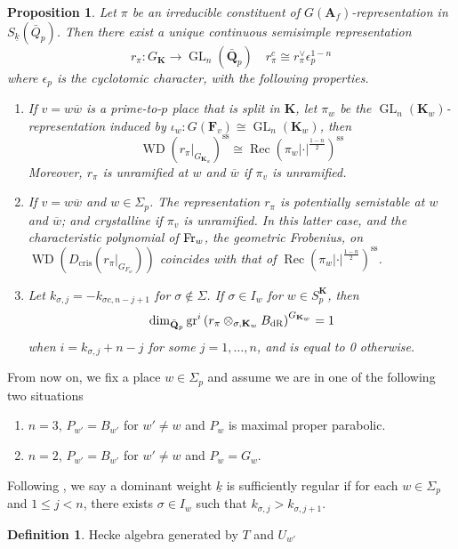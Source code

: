 \documentclass[leqno]{amsart}
\newcommand{\wt}[1]{\underline{ #1 }}
\newcommand{\bw}{\overline{w}}
\newcommand{\Fr}{\textnormal{Fr}} %
\newcommand{\dR}{\textnormal{dR}}
\DeclareMathOperator{\WD}{WD}
\DeclareMathOperator{\Rec}{Rec}
\DeclareMathOperator{\GL}{GL}
\newcommand{\Q}{{\mathbf{Q}}}
\newcommand{\A}{\mathbf A}
\newcommand{\F}{{\mathbf{F}}} %
\newcommand{\K}{{\mathbf{K}}} %
\newtheorem{prop}[thm]{Proposition}
\theoremstyle{definition}
\newtheorem{defn}[thm]{Definition}
\theoremstyle{remark}
\begin{document}
\begin{prop}\cite[Prop.2.27]{ger}
	Let $\pi$ be an irreducible constituent of 
	$G(\A_f)$-representation in $S_{\wt{k}}(\bar{Q}_p)$.
	Then there exist a unique continuous semisimple representation
	\[
	r_\pi: G_\K \rightarrow \GL_n(\bar{\Q}_p)\quad
	r_\pi^c \cong r_\pi^{\vee} \epsilon_p^{1-n}
	\]
	where $\epsilon_p$ is the cyclotomic character,
	with the following properties.
\begin{enumerate}[label=(\alph*)]
\item If $v=w\bw$ is a prime-to-$p$ place that is split in $\K$,
let $\pi_w$ be the $\GL_n(\K_w)$-representation
induced by $\iota_w\colon G(\F_v)\cong \GL_n(\K_w)$, then
\[
\WD\left(\left.r_\pi\right|_{G_{\K_w}}\right)^{\mathrm{ss}} \cong
\Rec(\pi_w|\cdot|^{\frac{1-n}{2}})^{\mathrm{ss}}
\]
Moreover, $r_\pi$ is unramified at $w$ and $\bw$ if $\pi_v$ is unramified.
\item If $v=w\bw$ and  $w\in \Sigma_p$.
The representation $r_\pi$ is potentially semistable at $w$ and  $\bw$;
and crystalline if $\pi_v$ is unramified.
In this latter case, 
and the characteristic polynomial of $\Fr_w$, the geometric Frobenius,
on $\WD\left(D_{\mathrm{cris }}\left(\left.r_\pi\right|_{G_{F_w}}\right)\right)$
coincides with that of $\Rec(\pi_w|\cdot|^{\frac{1-n}{2}})^{\mathrm{ss}}$.
\item 
Let $k_{\sigma,j}=-k_{\sigma c, n-j+1}$
for $\sigma\notin \Sigma$.
If $\sigma\in I_w$ for $w\in S_p^\K$, then
\[
\dim_{\bar{\Q}_p}\operatorname{gr}^i
\left(r_\pi \otimes_{\sigma, \K_w} B_{\dR}\right)^{G_{\K_w}}=1
\]
when $i=k_{\sigma, j}+n-j$ 
for some $j=1, \ldots, n$, and is equal to 0 otherwise.
\end{enumerate}
\end{prop}

From now on,
we fix a place $w\in \Sigma_p$ and
assume we are in one of the following two situations
\begin{enumerate}[label=(\Roman*)]
	\item $n=3$, $P_{w'}=B_{w'}$ for $w'\neq w$ and $P_w$ is
		maximal proper parabolic.
	\item $n=2$, $P_{w'}=B_{w'}$ for $w'\neq w$ and $P_w=G_w$.
\end{enumerate}

Following \cite{ger},
we say a dominant weight $\wt{k}$ is sufficiently regular
if for each $w\in \Sigma_p$ and $1\leq j<n$,
there exists  $\sigma\in I_w$
such that  $k_{\sigma,j}>k_{\sigma,j+1}$.

\begin{defn}
	Hecke algebra 
	generated by $T$ and $  U_{w'}$
\end{defn}
\end{document}
